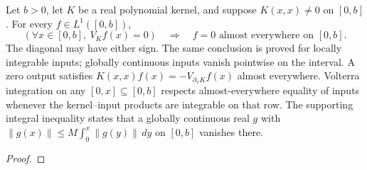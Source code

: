 \begin{theorem}
\label{thm:volterra-first-kind-uniqueness}
\leanok
Let $b>0$, let $K$ be a real polynomial kernel, and suppose
$K(x,x)\ne0$ on $[0,b]$. For every $f\in L^1([0,b])$,
\[
 (\forall x\in[0,b],\ V_K f(x)=0)\quad\Longrightarrow\quad f=0
 \text{ almost everywhere on }[0,b].
\]
The diagonal may have either sign. The same conclusion is proved for locally
integrable inputs; globally continuous inputs vanish pointwise on the interval.
A zero output satisfies
$K(x,x)f(x)=-V_{\partial_xK}f(x)$ almost everywhere. Volterra integration on any
$[0,x]\subseteq[0,b]$ respects almost-everywhere equality of inputs
whenever the kernel--input products are integrable on that row.
The supporting integral inequality states that a globally continuous real $g$ with
$\|g(x)\|\le M\int_0^x\|g(y)\|\,dy$ on $[0,b]$ vanishes there.
\end{theorem}
\begin{proof}
\leanok
\end{proof}

